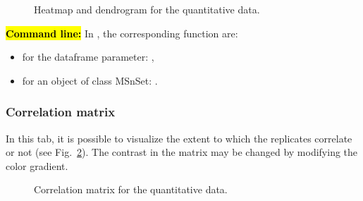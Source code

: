 \documentclass[12pt]{article}
\begin{document}
\begin {figure}
\centering
{}
\caption{Heatmap and dendrogram for the quantitative data.}\label{fig:sdhm}
\end {figure}

\hl{\bf Command line:} In , the corresponding function are:
\begin{itemize}
\item for the dataframe parameter: ,
\item for an object of class MSnSet: .
\end{itemize}

\subsubsection {Correlation matrix}

{In this tab, it is possible to visualize the extent to which the replicates correlate or not (see Fig.~\ref{fig:sdcm}). The contrast in the matrix may be changed by modifying the color gradient.}

\begin {figure}
\centering
{}
\caption{Correlation matrix for the quantitative data.}\label{fig:sdcm}
\end {figure}
\end{document}
